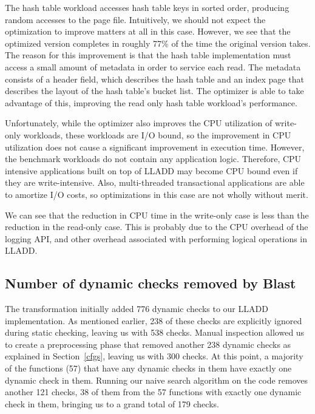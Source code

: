 \documentclass[10pt,letterpaper,twocolumn,english]{article}
\newcommand{\yad}{LLADD\xspace}
\begin{document}
The hash table workload accesses hash table keys in sorted order,
producing random accesses to the page file.  Intuitively, we should not
expect the optimization to improve matters at all in this case.
However, we see that the optimized version completes in roughly 77\%
of the time the original version takes.  The reason for this
improvement is that the hash table implementation must access a small
amount of metadata in order to service each read.  The metadata
consists of a header field, which describes the hash table and an
index page that describes the layout of the hash table's bucket list.
The optimizer is able to take advantage of this, improving the
read only hash table workload's performance.

Unfortunately, while the optimizer also improves the CPU utilization of
write-only workloads, these workloads are I/O bound, so the
improvement in CPU utilization does not cause a significant improvement
in execution time.  However, the benchmark workloads do not contain
any application logic.  Therefore, CPU intensive applications built
on top of \yad may become CPU bound even if they are write-intensive.  Also,
multi-threaded transactional applications are able to amortize I/O
costs, so optimizations in this case are not wholly without merit.

We can see that the reduction in CPU time in the write-only case is
less than the reduction in the read-only case.  This is probably due
to the CPU overhead of the logging API, and other overhead associated
with performing logical operations in \yad. 



\subsection{Number of dynamic checks removed by Blast}
The transformation initially added 776 dynamic checks to our LLADD implementation.  As mentioned earlier, 238 of these checks are explicitly ignored during static checking, leaving us with 538 checks.  Manual inspection allowed us to create a preprocessing phase that removed another 238 dynamic checks as explained in Section~\ref{cfgs}, leaving us with 300 checks.  At this point, a majority of the functions (57) that have any dynamic checks in them have exactly one dynamic check in them.  Running our naive search algorithm on the code removes another 121 checks, 38 of them from the 57 functions with exactly one dynamic check in them, bringing us to a grand total of 179 checks.
\end{document}
